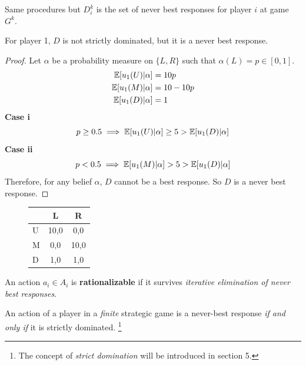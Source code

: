 \documentclass[11pt]{article}
\begin{document}
			\begin{corollary}
				 Same procedures but $D_i^k$ is the set of never best responses for player $i$ at game $G^k$.
			\end{corollary}
			
			\begin{example}
				For player 1, $D$ is not strictly dominated, but it is a never best response.
				\begin{proof}
					Let $\alpha$ be a probability measure on $\{L, R\}$ such that $\alpha(L) = p \in [0, 1]$.\\
					\begin{align}
						\mathbb{E}[{u_1(U)|\alpha}] &= 10p \\
						\mathbb{E}[{u_1(M)|\alpha}] &= 10 - 10p \\
						\mathbb{E}[{u_1(D)|\alpha}] &= 1
					\end{align}
					\textbf{Case i}
					\begin{equation}
						p \geq 0.5 \implies \mathbb{E}[{u_1(U)|\alpha}] \geq 5 > \mathbb{E}[{u_1(D)|\alpha}]
					\end{equation}
					\textbf{Case ii}
					\begin{equation}
						p < 0.5 \implies \mathbb{E}[{u_1(M)|\alpha}] > 5 > \mathbb{E}[{u_1(D)|\alpha}]
					\end{equation}
					Therefore, for any belief $\alpha$, $D$ cannot be a best response. So $D$ is a never best response.
				\end{proof}
			\end{example}
			\begin{figure}[h]
				\centering
				\begin{tabular}{l|cc}
				  & L & R\\
				  \hline
				  U & 10,0 & 0,0 \\
				  M & 0,0 & 10,0\\
				  D & 1,0 & 1,0
				\end{tabular}
			\end{figure}
			
			\begin{definition}
				An action $a_i \in A_i$ is \textbf{rationalizable} if it survives \emph{iterative elimination of never best responses}.
			\end{definition}
			
			\begin{lemma}[60.1]
				An action of a player in a \emph{finite} strategic game is a never-best response \emph{if and only if} it is strictly dominated. \footnote{The concept of \emph{strict domination} will be introduced in section 5.}
			\end{lemma}
		
\end{document}
